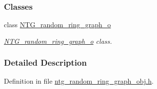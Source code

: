 \subsubsection*{Classes}
\begin{DoxyCompactItemize}
\item 
class \hyperlink{class_n_t_g__random__ring__graph__o}{NTG\_\-random\_\-ring\_\-graph\_\-o}
\begin{DoxyCompactList}\small\item\em \hyperlink{class_n_t_g__random__ring__graph__o}{NTG\_\-random\_\-ring\_\-graph\_\-o} class. \item\end{DoxyCompactList}\end{DoxyCompactItemize}


\subsubsection{Detailed Description}


Definition in file \hyperlink{ntg__random__ring__graph__obj_8h_source}{ntg\_\-random\_\-ring\_\-graph\_\-obj.h}.


